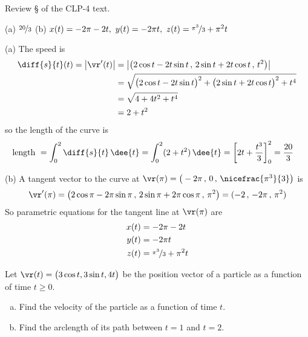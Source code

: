 \begin{hint} 
Review \S{} of the CLP-4 text.
\end{hint}

\begin{answer} 
(a) $\nicefrac{20}{3}$\qquad
(b) $x(t) = -2\pi -2t,\ 
     y(t) =  -2\pi t,\ 
     z(t) = \nicefrac{\pi^3}{3} + \pi^2 t$ 
\end{answer}

\begin{solution} (a) The speed is
\begin{align*}
\diff{s}{t}(t)
=\big|\vr'(t)\big| & = \left|\left(2\cos t - 2t\sin t\,,\,
                                  2\sin t + 2t \cos t\,,\,
                                  t^2\right)\right| \\
                  &=\sqrt{\big(2\cos t - 2t\sin t\big)^2
                         +\big(2\sin t + 2t \cos t\big)^2
                         +t^4} \\
                 &= \sqrt{4+ 4t^2 +t^4} \\
                 &= 2+t^2
\end{align*}
so the length of the curve is
\begin{align*}
\text{length }
&=\int_0^2 \diff{s}{t}\,\dee{t}
  =\int_0^2 (2+t^2)\,\dee{t}
  = \left[2t +\frac{t^3}{3}\right]_0^2
  =\frac{20}{3}
\end{align*}

\noindent (b)
A tangent vector to the curve at 
$\vr(\pi)=\big(-2\pi\,,\, 0\,,\, \nicefrac{\pi^3}{3}\big)$ is
\begin{equation*}
\vr'(\pi) = \left(2\cos\pi - 2\pi\sin\pi\,,\,
                                  2\sin\pi + 2\pi \cos\pi\,,\,
                                  \pi^2\right)
 = (-2\,,\,-2\pi\,,\,\pi^2)
\end{equation*}
So parametric equations for the tangent line at $\vr(\pi)$ are
\begin{align*}
x(t) &= -2\pi -2t \\
y(t) &=  -2\pi t \\
z(t) &= \nicefrac{\pi^3}{3} + \pi^2 t 
\end{align*}
\end{solution}

\begin{question}[M317 2010D]  %
Let $\vr(t) = \big(3 \cos t, 3 \sin t, 4t\big)$ be the position vector 
of a particle as a function of time $t \ge 0$.
\begin{enumerate}[(a)]
\item
Find the velocity of the particle as a function of time $t$.
\item
Find the arclength of its path between $t = 1$ and $t = 2$.
\end{enumerate}
\end{question}

